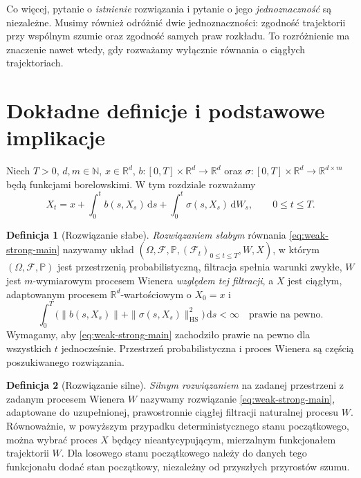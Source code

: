 \documentclass[11pt,a4paper,oneside]{report}
\numberwithin{equation}{chapter}
\theoremstyle{plain}
\theoremstyle{definition}
\newtheorem{definicja}{Definicja}[chapter]
\theoremstyle{remark}
\newcommand{\R}{\mathbb{R}}
\newcommand{\N}{\mathbb{N}}
\newcommand{\Prob}{\mathbb{P}}
\newcommand{\calF}{\mathcal{F}}
\newcommand{\dd}{\mathrm{d}}
\begin{document}
Co więcej, pytanie o \emph{istnienie} rozwiązania i pytanie
o jego \emph{jednoznaczność} są niezależne. Musimy również
odróżnić dwie jednoznaczności: zgodność trajektorii przy
wspólnym szumie oraz zgodność samych praw rozkładu. To
rozróżnienie ma znaczenie nawet wtedy, gdy rozważamy wyłącznie
równania o ciągłych trajektoriach.

\section{Dokładne definicje i podstawowe implikacje}\label{sec:volIII:14:02}

Niech $T>0$, $d,m\in\N$, $x\in\R^d$,
$b:[0,T]\times\R^d\to\R^d$ oraz
$\sigma:[0,T]\times\R^d\to\R^{d\times m}$ będą
funkcjami borelowskimi. W tym rozdziale rozważamy
\[
 X_t=x+\int_0^t b(s,X_s)\,\dd s
 +\int_0^t\sigma(s,X_s)\,\dd W_s,
 \qquad 0\le t\le T.
 \tag{14.1}\label{eq:weak-strong-main}
\]

\begin{definicja}[Rozwiązanie słabe]\label{def:volIII:14:01}
\label{def:weak-solution}
\emph{Rozwiązaniem słabym} równania \eqref{eq:weak-strong-main}
nazywamy układ
$(\Omega,\calF,\Prob,(\calF_t)_{0\le t\le T},W,X)$,
w którym $(\Omega,\calF,\Prob)$ jest przestrzenią
probabilistyczną, filtracja spełnia warunki zwykłe,
$W$ jest $m$-wymiarowym procesem Wienera \emph{względem tej
filtracji}, a $X$ jest ciągłym, adaptowanym procesem
$\R^d$-wartościowym o $X_0=x$ i
\[
 \int_0^T\bigl(\|b(s,X_s)\|+
 \|\sigma(s,X_s)\|_{\mathrm{HS}}^2\bigr)\,\dd s<\infty
 \quad\text{prawie na pewno}.
\]
Wymagamy, aby \eqref{eq:weak-strong-main} zachodziło
prawie na pewno dla wszystkich $t$ jednocześnie.
Przestrzeń probabilistyczna i proces Wienera są częścią
poszukiwanego rozwiązania.
\end{definicja}

\begin{definicja}[Rozwiązanie silne]\label{def:volIII:14:02}
\label{def:strong-solution-precise}
\emph{Silnym rozwiązaniem} na zadanej przestrzeni z zadanym
procesem Wienera $W$ nazywamy rozwiązanie
\eqref{eq:weak-strong-main}, adaptowane do uzupełnionej,
prawostronnie ciągłej filtracji naturalnej procesu $W$.
Równoważnie, w powyższym przypadku deterministycznego stanu
początkowego, można wybrać proces $X$ będący nieantycypującym,
mierzalnym funkcjonałem trajektorii $W$. Dla losowego stanu
początkowego należy do danych tego funkcjonału dodać stan
początkowy, niezależny od przyszłych przyrostów szumu.
\end{definicja}
\end{document}
